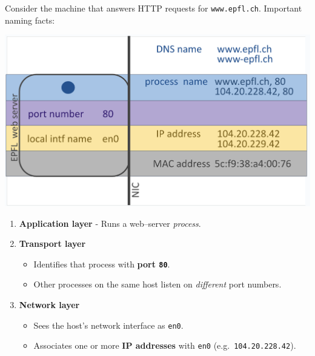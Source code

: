 \documentclass[../../compsys.tex]{subfiles}
\begin{document}
\begin{example}
  \noindent
  Consider the machine that answers HTTP requests for
  \texttt{www.epfl.ch}.  Important naming facts:\\

  \begin{minipage}[htp]{0.45\textwidth}
    \begin{center}
      \includegraphics[width=1.2\textwidth]{images/epfl-example.png}
    \end{center}
    \end{minipage}
    \hfill
  \begin{minipage}[htp]{0.45\textwidth}
    \small
  \begin{enumerate}

    \item \textbf{Application layer}  - Runs a web–server \emph{process}.
            
    \item \textbf{Transport layer}  
          \begin{itemize}
            \item Identifies that process with \textbf{port
                  \texttt{80}}.  
            \item Other processes on the same host listen on
                  \emph{different} port numbers.
          \end{itemize}
  
    \item \textbf{Network layer}  
          \begin{itemize}
            \item Sees the host’s network interface as \texttt{en0}.
            \item Associates one or more \textbf{IP addresses} with
                  \texttt{en0} (e.g.\ \texttt{104.20.228.42}).
          \end{itemize}
  

\end{enumerate}
\end{minipage}
\end{example}
\end{document}
